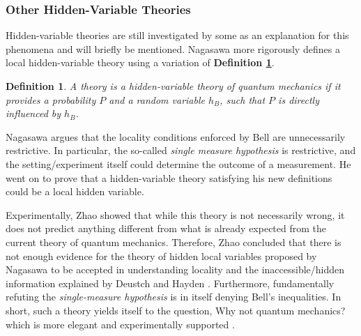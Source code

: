 \documentclass[%
 aip,
cp,  %
 amsmath,amssymb,%
 reprint,%
]{revtex4-2}
\newtheorem{definition}{Definition}
\begin{document}
    \subsubsection{Other Hidden-Variable Theories}

    Hidden-variable theories are still investigated by some as an explanation for this phenomena and will briefly be mentioned. Nagasawa more rigorously defines a local hidden-variable theory using a variation of \textbf{Definition \ref{def:hidden-variable}}.
    \begin{definition} \label{def:hidden-variable}
        A theory is a \textit{hidden-variable theory} of quantum mechanics if it provides a probability $P$ and a random variable $h_{B}$, such that $P$ is directly influenced by $h_B$.
    \end{definition}
    Nagasawa argues that the locality conditions enforced by Bell are unnecessarily restrictive. In particular, the so-called \textit{single measure hypothesis} is restrictive, and the setting/experiment itself could determine the outcome of a measurement. He went on to prove that a hidden-variable theory satisfying his new definitions could be a local hidden variable. 


    Experimentally, Zhao \cite{zhao_2013} showed that while this theory is not necessarily wrong, it does not predict anything different from what is already expected from the current theory of quantum mechanics. Therefore, Zhao concluded that there is not enough evidence for the theory of hidden local variables proposed by Nagasawa to be accepted in understanding locality and the inaccessible/hidden information explained by Deustch and Hayden \cite{Deutsch_2000}. Furthermore, fundamentally refuting the \textit{single-measure hypothesis} is in itself denying Bell's inequalities. In short, such a theory yields itself to the question, Why not quantum mechanics? which is more elegant and experimentally supported \cite{aspect}.
    
\end{document}

